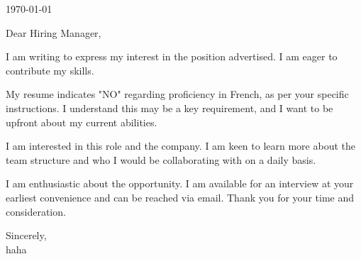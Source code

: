 \documentclass[letterpaper,11pt]{article}
\begin{document}
\today \\
\vspace{20pt}

Dear Hiring Manager, \\
\vspace{10pt}

I am writing to express my interest in the position advertised. I am eager to contribute my skills.
\vspace{10pt}

My resume indicates "NO" regarding proficiency in French, as per your specific instructions. I understand this may be a key requirement, and I want to be upfront about my current abilities.
\vspace{10pt}

I am interested in this role and the company. I am keen to learn more about the team structure and who I would be collaborating with on a daily basis.
\vspace{10pt}

I am enthusiastic about the opportunity. I am available for an interview at your earliest convenience and can be reached via email. Thank you for your time and consideration.
\vspace{20pt}

Sincerely, \\
\vspace{40pt} %
haha

\end{document}
